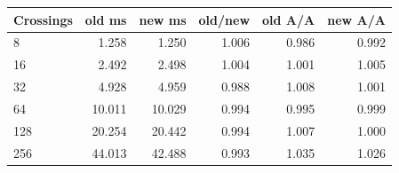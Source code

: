 \begin{center}\small
\begin{tabular}{@{}lrrrrr@{}}
\toprule
Crossings & old ms & new ms & old/new & old A/A & new A/A \\
\midrule
8 & 1.258 & 1.250 & 1.006 & 0.986 & 0.992 \\
16 & 2.492 & 2.498 & 1.004 & 1.001 & 1.005 \\
32 & 4.928 & 4.959 & 0.988 & 1.008 & 1.001 \\
64 & 10.011 & 10.029 & 0.994 & 0.995 & 0.999 \\
128 & 20.254 & 20.442 & 0.994 & 1.007 & 1.000 \\
256 & 44.013 & 42.488 & 0.993 & 1.035 & 1.026 \\
\bottomrule
\end{tabular}
\end{center}
